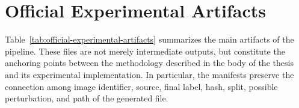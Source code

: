\section{Official Experimental Artifacts}
\label{app:official-experimental-artifacts}

Table~\ref{tab:official-experimental-artifacts} summarizes the main artifacts
of the pipeline. These files are not merely intermediate outputs, but constitute
the anchoring points between the methodology described in the body of the thesis
and its experimental implementation. In particular, the manifests preserve the
connection among image identifier, source, final label, hash, split, possible
perturbation, and path of the generated file.

